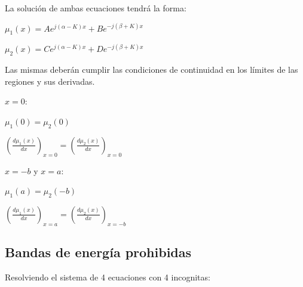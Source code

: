 \documentclass[oneside]{book}
\numberwithin{equation}{section}
\numberwithin{figure}{section}
\numberwithin{table}{section}
\begin{document}
			\vfill
			La solución de ambas ecuaciones tendrá la forma:
			
				\begin{center}
					$\displaystyle \mu_1(x)=A e^{j(\alpha-K)x}+B e^{-j(\beta+K)x}$
				\end{center}
				\begin{center}
					$\displaystyle \mu_2(x)=C e^{j(\alpha-K)x}+D e^{-j(\beta+K)x}$
				\end{center}
			
			Las mismas deberán cumplir las condiciones de continuidad en los límites de las regiones y sus derivadas.
			
			\begin{minipage}[t]{0.5\textwidth}
				\begin{center}
					$x=0$:\\
				\end{center}
				\begin{center}
					$\displaystyle \mu_1(0)=\mu_2(0)$\\		
				\end{center}
				\begin{center}
					$\displaystyle \left(\frac{d\mu_1(x)}{dx}\right)_{x=0}=\left(\frac{d\mu_2(x)}{dx}\right)_{x=0}$\\		
				\end{center}
			\end{minipage}
			\begin{minipage}[t]{0.5\textwidth}
				\begin{flushleft}
					$x=-b$ y $x=a$:\\
				\end{flushleft}
				\begin{flushleft}
					$\displaystyle \mu_1(a)=\mu_2(-b)$\\		
				\end{flushleft}
				\begin{flushleft}
					$\displaystyle \left(\frac{d\mu_1(x)}{dx}\right)_{x=a}=\left(\frac{d\mu_2(x)}{dx}\right)_{x=-b}$\\		
				\end{flushleft}
			\end{minipage}
	
			\subsection{Bandas de energía prohibidas}
			
				Resolviendo el sistema de 4 ecuaciones con 4 incognitas:
				
\end{document}
